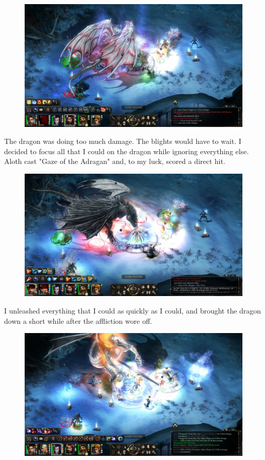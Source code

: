 \documentclass{article}
\begin{document}
\begin{figure}
\includegraphics[scale=0.33]{files/blog/2019_08_17_poe_potd_wmpt1/2019_08_17_alpine_dragon_4.jpg}
\end{figure}

The dragon was doing too much damage.  The blights would have to wait.  I decided to focus all that I could on the dragon while ignoring everything else.  Aloth cast "Gaze of the Adragan" and, to my luck, scored a direct hit.

\begin{figure}
\includegraphics[scale=0.33]{files/blog/2019_08_17_poe_potd_wmpt1/2019_08_17_alpine_dragon_5.jpg}
\end{figure}

I unleashed everything that I could as quickly as I could, and brought the dragon down a short while after the affliction wore off.

\begin{figure}
\includegraphics[scale=0.33]{files/blog/2019_08_17_poe_potd_wmpt1/2019_08_17_alpine_dragon_6.jpg}
\end{figure}
\end{document}
